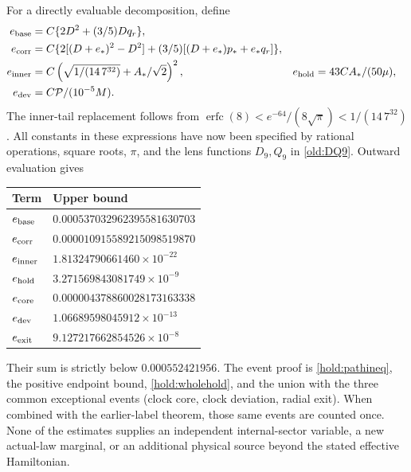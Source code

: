 \documentclass[11pt]{article}
\theoremstyle{definition}\newtheorem{definition}[theorem]{Definition}
\theoremstyle{remark}\newtheorem{remark}[theorem]{Remark}
\begin{document}
For a directly evaluable decomposition, define
\begin{align*}
 e_{\rm base}&=C\{2D^2+(3/5)Dq_r\},\\
 e_{\rm corr}&=C\{2[(D+e_*)^2-D^2]
                   +(3/5)[(D+e_*)p_*+e_*q_r]\},\\
 e_{\rm inner}&=C\left(\sqrt{1/(14\,7^{32})}+A_*/\sqrt2\right)^2,
 &e_{\rm hold}&=43CA_*/(50\mu),\\
 e_{\rm dev}&=C\mathcal P/(10^{-5}M).
\end{align*}
The inner-tail replacement follows from
$\operatorname{erfc}(8)<e^{-64}/(8\sqrt\pi)
<1/(14\,7^{32})$.  All constants in these expressions have now
been specified by rational operations, square roots, $\pi$, and the
lens functions $D_9,Q_9$ in \eqref{old:DQ9}.  Outward evaluation gives
\begin{center}\small
\begin{tabular}{ll}\toprule
Term & Upper bound\\\midrule
$e_{\rm base}$ & $0.000537032962395581630703$\\
$e_{\rm corr}$ & $0.000010915589215098519870$\\
$e_{\rm inner}$ & $1.81324790661460\times10^{-22}$\\
$e_{\rm hold}$ & $3.271569843081749\times10^{-9}$\\
$e_{\rm core}$ & $0.000004378860028173163338$\\
$e_{\rm dev}$ & $1.06689598045912\times10^{-13}$\\
$e_{\rm exit}$ & $9.127217662854526\times10^{-8}$\\\bottomrule
\end{tabular}
\end{center}
Their sum is strictly below $0.000552421956$.
The event proof is \eqref{hold:pathineq}, the positive endpoint
bound, \eqref{hold:wholehold}, and the union with the three common
exceptional events (clock core, clock deviation, radial exit).
When combined with the earlier-label theorem, those same events
are counted once.  None of the estimates supplies an independent
internal-sector variable, a new actual-law marginal, or an additional
physical source beyond the stated effective Hamiltonian.
\end{document}
